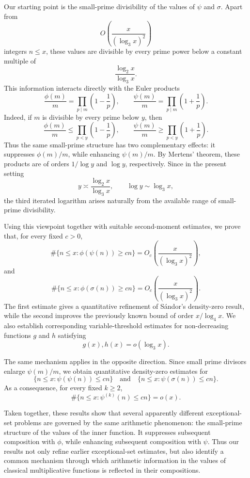 \documentclass{article}
\theoremstyle{remark}
\begin{document}
Our starting point is the small-prime divisibility of the values of
\(\psi\) and \(\sigma\). Apart from
\[
O\left(\frac{x}{(\log_3x)^2}\right)
\]
integers \(n\le x\), these values are divisible by every prime power
below a constant multiple of
\[
\frac{\log_2x}{\log_3x}.
\]
This information interacts directly with the Euler products
\[
\frac{\phi(m)}{m}
=
\prod_{p\mid m}\left(1-\frac1p\right),
\qquad
\frac{\psi(m)}{m}
=
\prod_{p\mid m}\left(1+\frac1p\right).
\]
Indeed, if \(m\) is divisible by every prime below \(y\), then
\[
\frac{\phi(m)}{m}
\le
\prod_{p<y}\left(1-\frac1p\right),
\qquad
\frac{\psi(m)}{m}
\ge
\prod_{p<y}\left(1+\frac1p\right).
\]
Thus the same small-prime structure has two complementary effects:
it suppresses \(\phi(m)/m\), while enhancing \(\psi(m)/m\).
By Mertens' theorem, these products are of orders \(1/\log y\) and
\(\log y\), respectively. Since in the present setting
\[
y\asymp\frac{\log_2x}{\log_3x},
\qquad
\log y\sim\log_3x,
\]
the third iterated logarithm arises naturally from the available range
of small-prime divisibility.

Using this viewpoint together with suitable second-moment estimates,
we prove that, for every fixed \(c>0\),
\[
\#\{n\le x:\phi(\psi(n))\ge cn\}
=
O_c\left(\frac{x}{(\log_3x)^2}\right),
\]
and
\[
\#\{n\le x:\phi(\sigma(n))\ge cn\}
=
O_c\left(\frac{x}{(\log_3x)^2}\right).
\]
The first estimate gives a quantitative refinement of Sándor's
density-zero result, while the second improves the previously known
bound of order \(x/\log_4x\). We also establish corresponding
variable-threshold estimates for non-decreasing functions \(g\) and
\(h\) satisfying
\[
g(x),h(x)=o(\log_3x).
\]

The same mechanism applies in the opposite direction. Since small
prime divisors enlarge \(\psi(m)/m\), we obtain quantitative
density-zero estimates for
\[
\{n\le x:\psi(\psi(n))\le cn\}
\quad\text{and}\quad
\{n\le x:\psi(\sigma(n))\le cn\}.
\]
As a consequence, for every fixed \(k\ge2\),
\[
\#\{n\le x:\psi^{(k)}(n)\le cn\}=o(x).
\]

Taken together, these results show that several apparently different
exceptional-set problems are governed by the same arithmetic
phenomenon: the small-prime structure of the values of the inner
function. It suppresses subsequent composition with \(\phi\), while
enhancing subsequent composition with \(\psi\). Thus our results not
only refine earlier exceptional-set estimates, but also identify a
common mechanism through which arithmetic information in the values of
classical multiplicative functions is reflected in their compositions.
\end{document}
